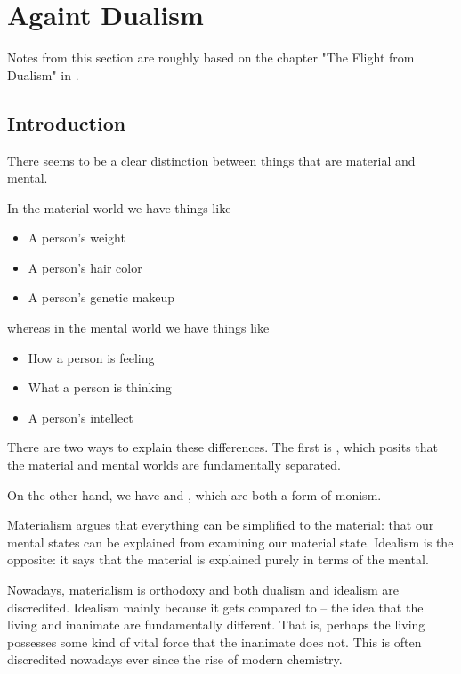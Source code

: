 \section{Againt Dualism}
\label{against-dualism}

Notes from this section are roughly based on the chapter "The Flight from Dualism" in \cite{pomac}.

\subsection{Introduction}

There seems to be a clear distinction between things that are material and mental.

In the material world we have things like
\begin{itemize}
    \item A person's weight
    \item A person's hair color
    \item A person's genetic makeup
\end{itemize}
whereas in the mental world we have things like
\begin{itemize}
    \item How a person is feeling
    \item What a person is thinking
    \item A person's intellect
\end{itemize}

There are two ways to explain these differences. The first is , which posits that the material and mental worlds are fundamentally separated.

On the other hand, we have  and , which are both a form of monism.

Materialism argues that everything can be simplified to the material: that our mental states can be explained from examining our material state. Idealism is the opposite: it says that the material is explained purely in terms of the mental.

Nowadays, materialism is orthodoxy and both dualism and idealism are discredited. Idealism mainly because it gets compared to  -- the idea that the living and inanimate are fundamentally different. That is, perhaps the living possesses some kind of vital force that the inanimate does not. This is often discredited nowadays ever since the rise of modern chemistry.

